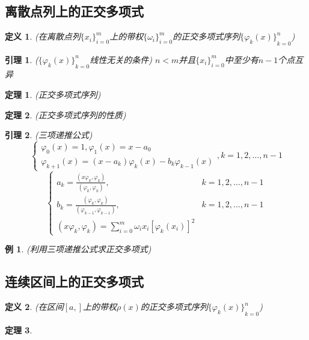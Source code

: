 \documentclass[twoside]{article}
\newtheorem{theorem}{定理}[section]
\newtheorem{lemma}{引理}[section]
\newtheorem{definition}{定义}[section]
\newtheorem{eg}{例}[section]
\begin{document}
\subsection{离散点列上的正交多项式}
\begin{definition}
  (在离散点列${ \{x_i\} }^m_{i=0}$上的带权${ \{\omega_i\} }^m_{i=0}$的正交多项式序列${ \{\varphi_k(x)\} }^n_{k=0}$)
\end{definition}
\begin{lemma}
  (${ \{\varphi_k(x)\} }^n_{k=0}$线性无关的条件)
  $n<m$并且${ \{x_i\} }^m_{i=0}$中至少有$n-1$个点互异
\end{lemma}
\begin{theorem}
  (正交多项式序列)
\end{theorem}
\begin{theorem}
  (正交多项式序列的性质)
\end{theorem}
\begin{lemma}
  (三项递推公式)
  \begin{equation}
    \begin{cases}{}
      \varphi_0(x)=1, \varphi_1(x)=x-a_0 \\
      \varphi_{k+1}(x)=(x-a_k)\varphi_k(x)-b_k\varphi_{k-1}(x)
    \end{cases}
    ,k=1,2,\ldots, n-1
  \end{equation}
  \begin{equation}
    \begin{cases}{}
      a_k = \frac{(x\varphi_k, \varphi_k)}{(\varphi_k, \varphi_k)}, & k=1,2,\ldots, n-1\\
      b_k = \frac{(\varphi_k, \varphi_k)}{(\varphi_{k-1}, \varphi_{k-1})}, & k=1,2,\ldots, n-1\\
      (x\varphi_k, \varphi_k) = \sum^m_{i=0} \omega_i x_i { [\varphi_k(x_i)] }^2
    \end{cases}
  \end{equation}
\end{lemma}
\begin{eg}
  (利用三项递推公式求正交多项式)
\end{eg}
\subsection{连续区间上的正交多项式}
\begin{definition}
  (在区间$[a,]$上的带权$\rho(x)$的正交多项式序列${ \{\varphi_k(x)\} }^n_{k=0}$)
\end{definition}
\begin{theorem}
\end{theorem}
\end{document}

